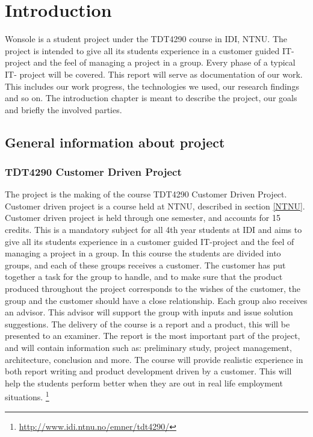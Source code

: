 \chapter{Introduction}

\minitoc

Wonsole is a student project under the TDT4290 course in IDI, NTNU. The project is intended to give all its students experience in a customer guided IT- project and the feel of managing a project in a group. Every phase of a typical IT- project will be covered. This report will serve as documentation of our work. This includes our work progress, the technologies we used, our research findings and so on. The introduction chapter is meant to describe the project, our goals and briefly the involved parties.

\clearpage

\section{General information about project}

\subsection{TDT4290 Customer Driven Project}
The project is the making of the course TDT4290 Customer Driven Project. Customer driven project is a course held at NTNU, described in section \ref{NTNU}. Customer driven project is held through one semester, and accounts for 15 credits. This is a mandatory subject for all 4th year students at IDI and aims to give all its students experience in a customer guided IT-project and the feel of managing a project in a group. In this course the students are divided into groups, and each of these groups receives a customer. 
The customer has put together a task for the group to handle, and to make sure that the product produced throughout the project corresponds to the wishes of the customer, the group and the customer should have a close relationship. 
Each group also receives an advisor. This advisor will support the group with inputs and issue solution suggestions. 
The delivery of the course is a report and a product, this will be presented to an examiner. The report is the most important part of the project, and will contain information such as: preliminary study, project management, architecture, conclusion and more. 
The course will provide realistic experience in both report writing and product development driven by a customer. This will help the students perform better when they are out in real life employment situations.
\footnote{\url{http://www.idi.ntnu.no/emner/tdt4290/}}

